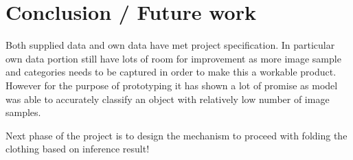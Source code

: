\documentclass[10pt,journal,compsoc]{IEEEtran}
\begin{document}
\section{Conclusion / Future work}
Both supplied data and own data have met project specification.  In particular own data portion still have lots of room for improvement as more image sample and categories needs to be captured in order to make this a workable product.  However for the purpose of prototyping it has shown a lot of promise as model was able to accurately classify an object with relatively low number of image samples. \linebreak

Next phase of the project is to design the mechanism to proceed with folding the clothing based on inference result!




\end{document}
